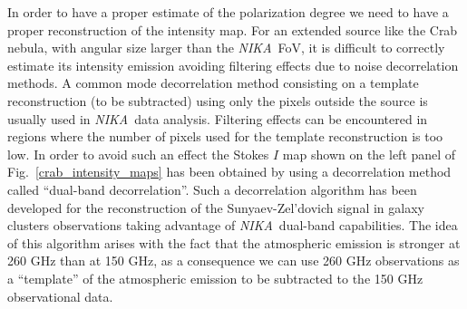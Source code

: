 \documentclass[twocolumn,traditabstract]{aa}
\def\NIKA{\textit{NIKA}}
\begin{document}
In order to have a proper estimate of the polarization degree we need to have a proper reconstruction of the intensity map. For an extended source like the Crab nebula, with angular size larger than the \NIKA\ FoV, it is difficult to correctly estimate its intensity emission avoiding filtering effects due to noise decorrelation methods. A common mode decorrelation method consisting on a template reconstruction (to be subtracted) using only the pixels outside the source is usually used in \NIKA\ data analysis. Filtering effects can be encountered in regions where the number of pixels used for the template reconstruction is too low.
In order to avoid such an effect the Stokes $I$ map shown on the left panel of Fig.~\ref{crab_intensity_maps} has been obtained by using a decorrelation method called ``dual-band decorrelation''. Such a decorrelation algorithm has been developed for the reconstruction of the Sunyaev-Zel'dovich signal in galaxy clusters observations \citep{adam2013} taking advantage of \NIKA\ dual-band capabilities. The idea of this algorithm arises with the fact that the atmospheric emission is stronger at 260 GHz than at 150 GHz, as a consequence we can use 260 GHz observations as a ``template'' of the atmospheric emission to be subtracted to the 150 GHz observational data.
 







\end{document}
